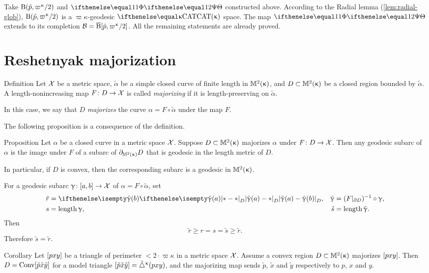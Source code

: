 Take $\oBall(\hat p,\varpi\kappa/2)$ and $\map$ constructed above.
According to the Radial lemma (\ref{lem:radial-glob}), $\oBall(\hat p,\varpi\kappa/2)$ is a $\varpi\kappa$-geodesic $\CAT\kappa$ space.
The map $\map$ extends to its completion $\spc{B}=\cBall[\hat p,\varpi\kappa/2]$. 
All the remaining statements are already proved.
\qeds

\section{Reshetnyak majorization}\label{sec:resh-kirz}

\begin{thm}{Definition}\label{def:majorize}
Let $\mathcal{X}$ be a metric space,
$\tilde \alpha$ be a simple closed curve of finite length  in $\mathbb{M}_{{}}^{2}({\upkappa})$,
and $D\subset\Lob2{\kappa}$ be a closed region bounded by $\tilde \alpha$.
A length-nonincreasing map $F\:D\to\spc{X}$ is called \emph{majorizing} if it is length-preserving on $\tilde \alpha$.

In this case, we say that $D$ \emph{majorizes} the curve $\alpha=F\circ\tilde \alpha$ under the map $F$.
\end{thm}

The following proposition is a consequence of the definition.

\begin{thm}{Proposition}
\label{prop:majorize-geodesic} 
Let  $\alpha$  be a closed curve in a metric space $\mathcal{X}$.
Suppose $D\subset\Lob2{\kappa}$ majorizes $\alpha$ under $F\: D \to \spc{X}$.  
Then any geodesic subarc of $\alpha$ is the image under $F$ of a subarc of $\partial_{\mathbb{M}_{{}}^{2}({\upkappa})} D$ that is geodesic in the length metric of $D$.

In particular, if $D$ is convex, then the corresponding subarc is a geodesic in $\mathbb{M}_{{}}^{2}({\upkappa})$.
\end{thm}

 For a geodesic subarc $\gamma\:[a,b]\to\spc{X}$ of $\alpha=F\circ\tilde \alpha$, set
\begin{align*}
\tilde r&=\dist{\tilde \gamma(a)}{\tilde \gamma(b)}{D},
&
\tilde \gamma &= (F|_{\Fr D})^{-1}\circ\gamma,
\\
s&=\length \gamma,
&
\tilde s&= \length \tilde \gamma.
\end{align*}
Then
\[\tilde r\ge r = s =\tilde s\ge\tilde r.\]
Therefore $\tilde s=\tilde r$.
\qeds

\begin{thm}{Corollary}\label{cor:maj-triangle}
Let $[{p}{x}{y}]$ be a triangle of perimeter $<2\cdot\varpi\kappa$ in a metric space $\mathcal{X}$. Assume a convex region $D\subset \Lob2\kappa$ majorizes $[{p}{x}{y}]$.
Then $D=\mathop{\rm Conv}\nolimits[{\tilde p}{\tilde x}{\tilde y}]$ for a model triangle $[{\tilde p}{\tilde x}{\tilde y}]={\tilde\triangle}^{\upkappa}(p x y)$, and the majorizing map sends  $\tilde p$, $\tilde x$ and $\tilde y$ respectively to $p$, $x$ and $y$.
\end{thm}

